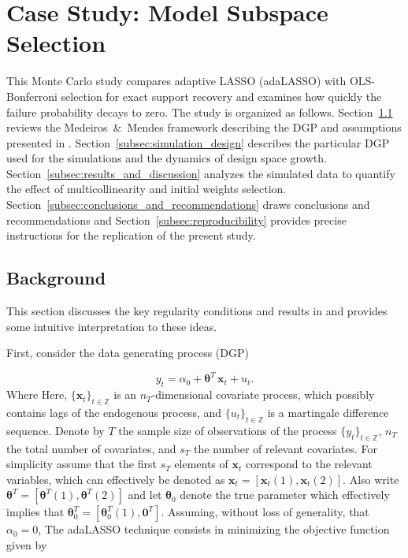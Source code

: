 \documentclass[10pt,a4paper,oneside]{article}
\newcommand{\Z}{\mathbb{Z}}
\providecommand{\DIFaddtex}[1]{{\protect\color{blue} \sf #1}} %
\providecommand{\DIFdeltex}[1]{{\protect\color{red} \scriptsize #1}} %
\providecommand{\DIFaddbegin}{} %
\providecommand{\DIFaddend}{} %
\providecommand{\DIFdelbegin}{} %
\providecommand{\DIFdelend}{} %
\providecommand{\DIFadd}[1]{\texorpdfstring{\DIFaddtex{#1}}{#1}} %
\providecommand{\DIFdel}[1]{\texorpdfstring{\DIFdeltex{#1}}{}} %
\newcommand{\DIFscaledelfig}{0.5}
\newlength{\DIFdelgraphicswidth} %
\newlength{\DIFdelgraphicsheight} %
\newcommand{\DIFaddincludegraphics}[2][]{{\color{blue}\fbox{\DIFOincludegraphics[#1]{#2}}}} %
\newcommand{\DIFdelincludegraphics}[2][]{%
\sbox{\DIFdelgraphicsbox}{\DIFOincludegraphics[#1]{#2}}%
\settoboxwidth{\DIFdelgraphicswidth}{\DIFdelgraphicsbox} %
\settoboxtotalheight{\DIFdelgraphicsheight}{\DIFdelgraphicsbox} %
\scalebox{\DIFscaledelfig}{%
\parbox[b]{\DIFdelgraphicswidth}{\usebox{\DIFdelgraphicsbox}\\[-\baselineskip] \rule{\DIFdelgraphicswidth}{0em}}\llap{\resizebox{\DIFdelgraphicswidth}{\DIFdelgraphicsheight}{%
\setlength{\unitlength}{\DIFdelgraphicswidth}%
\begin{picture}(1,1)%
\thicklines\linethickness{2pt} %
{\color[rgb]{1,0,0}\put(0,0){\framebox(1,1){}}}%
{\color[rgb]{1,0,0}\put(0,0){\line( 1,1){1}}}%
{\color[rgb]{1,0,0}\put(0,1){\line(1,-1){1}}}%
\end{picture}%
}\hspace*{3pt}}} %
} %
\DeclareRobustCommand{\DIFaddbegin}{\DIFOaddbegin \let\includegraphics\DIFaddincludegraphics} %
\DeclareRobustCommand{\DIFaddend}{\DIFOaddend \let\includegraphics\DIFOincludegraphics} %
\DeclareRobustCommand{\DIFdelbegin}{\DIFOdelbegin \let\includegraphics\DIFdelincludegraphics} %
\DeclareRobustCommand{\DIFdelend}{\DIFOaddend \let\includegraphics\DIFOincludegraphics} %
\begin{document}
\clearpage
\section{Case Study: Model Subspace Selection}
\label{ap:case_study_var_selection}

This Monte Carlo study compares adaptive LASSO (adaLASSO) \citep{Zou01122006,MEDEIROS2016255} with OLS-Bonferroni selection for exact support recovery and examines how quickly the failure probability decays to zero. The study is organized as follows. Section~\ref{subsec:background} reviews the Medeiros~\&~Mendes framework describing the DGP and assumptions presented in \cite{MEDEIROS2016255}.  Section~\ref{subsec:simulation_design} describes the particular DGP used for the simulations and the dynamics of design space growth. Section~\ref{subsec:results_and_discussion} analyzes the simulated data to quantify the effect of multicollinearity and initial weights selection. Section~\ref{subsec:conclusions_and_recommendations} draws conclusions and recommendations and Section~\ref{subsec:reproducibility} provides precise instructions for the replication of the present study.

\subsection{Background}
\label{subsec:background}

This section discusses the key regularity conditions and results in \cite{MEDEIROS2016255} and provides some intuitive interpretation to these ideas.

First, consider the data generating process (DGP) 

\begin{equation}
    y_t = \alpha_0 + \boldsymbol{\theta}^T\,\mathbf{x}_t + u_t.
    \label{eq:dgp_medmen}
\end{equation}
\DIFdelbegin \DIFdel{Where }\DIFdelend \DIFaddbegin \DIFadd{Here, }\DIFaddend $\{\mathbf{x}_t\}_{t \in \Z}$ is an $n_T$-dimensional covariate process, which possibly contains lags of the endogenous process, and $\{u_t\}_{t \in \Z}$ is a martingale difference sequence. Denote by $T$ the sample size of observations of the process $\{y_t \}_{t\in \Z}$, $n_T$ the total number of covariates, and $s_T$ the number of relevant covariates. For simplicity assume that the first $s_T$ elements of $\mathbf{x}_t$ correspond to the relevant variables, which can effectively be denoted as $\mathbf{x}_t = [\mathbf{x}_t(1), \mathbf{x}_t(2)]$. Also write $\boldsymbol{\theta}^T = [\boldsymbol{\theta}^T(1), \boldsymbol{\theta}^T(2)]$ and let $\boldsymbol{\theta}_0$ denote the true parameter which effectively implies that $\boldsymbol{\theta}_0^T = [\boldsymbol{\theta}_0^T(1), \mathbf{0}^T]$. Assuming, without loss of generality, that $\alpha_0 = 0$, The adaLASSO technique consists in minimizing the objective function given by
\end{document}

